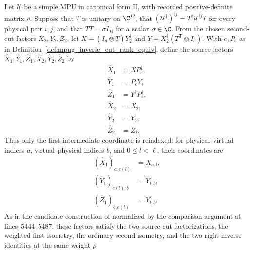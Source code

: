 \begin{definition}
    \label{def:mpug_inverse_compatible_source_factors}
    \leanok
    Let $\mathcal U$ be a simple MPU in canonical form II, with recorded
    positive-definite matrix $\rho$. Suppose that $T$ is unitary on
    $\C^D$, that $(\mathcal U^\dagger)^{ij}=T^\dagger\mathcal U^{ij}T$
    for every physical pair $i,j$, and that $T\overline T=\sigma I_D$
    for a scalar $\sigma\in\C$. From the chosen second-cut factors
    $X_2,Y_2,Z_2$, let $X=(I_d\otimes\overline T)Y_2^\dagger$ and
    $Y=X_2^\dagger(T^{\mathsf T}\otimes I_d)$. With $e,P_e$ as in
    Definition~\ref{def:mpug_inverse_cut_rank_equiv}, define the source
    factors $\widehat X_1,\widehat Y_1,\widehat Z_1,
        \widehat X_2,\widehat Y_2,\widehat Z_2$ by
    \begin{align}
        \widehat X_1 & =XP_e^\dagger,          \\
        \widehat Y_1 & =P_eY,                  \\
        \widehat Z_1 & =Y^\dagger P_e^\dagger, \\
        \widehat X_2 & =X_2,                   \\
        \widehat Y_2 & =Y_2,                   \\
        \widehat Z_2 & =Z_2.
    \end{align}
    Thus only the first intermediate coordinate is reindexed: for
    physical--virtual indices $a$, virtual--physical indices $b$, and
    $0\leq l<\ell$, their coordinates are
    \begin{align}
        (\widehat X_1)_{a,e(l)} & =X_{a,l},            \\
        (\widehat Y_1)_{e(l),b} & =Y_{l,b},            \\
        (\widehat Z_1)_{b,e(l)} & =\overline{Y_{l,b}}.
    \end{align}
    As in the candidate construction of
    \cite[lines~5390--5432]{FrancoRubio2025MPUGauging} normalized by the
    comparison argument at lines~5444--5487, these factors satisfy the two
    source-cut factorizations, the weighted first isometry, the ordinary second
    isometry, and the two right-inverse identities at the same weight $\rho$.
\end{definition}
